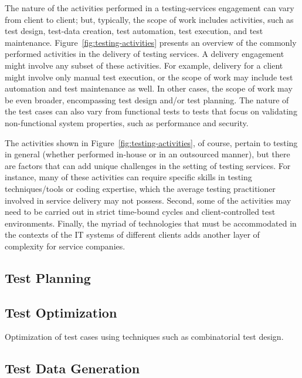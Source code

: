 The nature of the activities performed in a testing-services engagement can vary
from client to client; but, typically, the scope of work includes activities,
such as test design, test-data creation, test automation, test execution, and
test maintenance. Figure~\ref{fig:testing-activities} presents an overview of
the commonly performed activities in the delivery of testing services. A
delivery engagement might involve any subset of these activities. For example,
delivery for a client might involve only manual test execution, or the scope of
work may include test automation and test maintenance as well. In other cases,
the scope of work may be even broader, encompassing test design and/or test
planning. The nature of the test cases can also vary from functional tests to
tests that focus on validating non-functional system properties, such as
performance and security.

The activities shown in Figure~\ref{fig:testing-activities}, of course, pertain
to testing in general (whether performed in-house or in an outsourced manner),
but there are factors that can add unique challenges in the setting of testing
services. For instance, many of these activities can require specific skills in
testing techniques/tools or coding expertise, which the average testing
practitioner involved in service delivery may not possess. Second, some of the
activities may need to be carried out in strict time-bound cycles and
client-controlled test environments. Finally, the myriad of technologies that
must be accommodated in the contexts of the IT systems of different clients adds
another layer of complexity for service companies.

\subsection{Test Planning}
\label{sec:test-planning}

\subsection{Test Optimization}
\label{sec:test-design}

Optimization of test cases using techniques such as combinatorial test design.

\subsection{Test Data Generation}
\label{sec:test-data}



